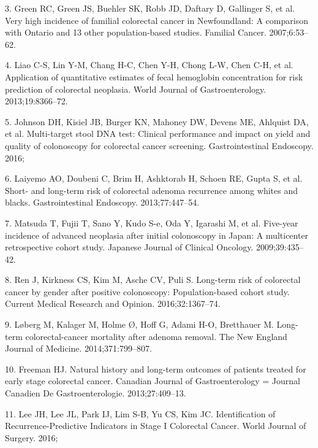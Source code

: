 \documentclass[12pt,]{article}
\begin{document}
\hypertarget{ref-green_very_2007}{}
3. Green RC, Green JS, Buehler SK, Robb JD, Daftary D, Gallinger S, et
al. Very high incidence of familial colorectal cancer in Newfoundland: A
comparison with Ontario and 13 other population-based studies. Familial
Cancer. 2007;6:53--62.

\hypertarget{ref-liao_application_2013}{}
4. Liao C-S, Lin Y-M, Chang H-C, Chen Y-H, Chong L-W, Chen C-H, et al.
Application of quantitative estimates of fecal hemoglobin concentration
for risk prediction of colorectal neoplasia. World Journal of
Gastroenterology. 2013;19:8366--72.

\hypertarget{ref-johnson_multi-target_2016}{}
5. Johnson DH, Kisiel JB, Burger KN, Mahoney DW, Devens ME, Ahlquist DA,
et al. Multi-target stool DNA test: Clinical performance and impact on
yield and quality of colonoscopy for colorectal cancer screening.
Gastrointestinal Endoscopy. 2016;

\hypertarget{ref-laiyemo_short-_2013}{}
6. Laiyemo AO, Doubeni C, Brim H, Ashktorab H, Schoen RE, Gupta S, et
al. Short- and long-term risk of colorectal adenoma recurrence among
whites and blacks. Gastrointestinal Endoscopy. 2013;77:447--54.

\hypertarget{ref-matsuda_five-year_2009}{}
7. Matsuda T, Fujii T, Sano Y, Kudo S-e, Oda Y, Igarashi M, et al.
Five-year incidence of advanced neoplasia after initial colonoscopy in
Japan: A multicenter retrospective cohort study. Japanese Journal of
Clinical Oncology. 2009;39:435--42.

\hypertarget{ref-ren_long-term_2016}{}
8. Ren J, Kirkness CS, Kim M, Asche CV, Puli S. Long-term risk of
colorectal cancer by gender after positive colonoscopy: Population-based
cohort study. Current Medical Research and Opinion. 2016;32:1367--74.

\hypertarget{ref-loberg_long-term_2014}{}
9. Løberg M, Kalager M, Holme Ø, Hoff G, Adami H-O, Bretthauer M.
Long-term colorectal-cancer mortality after adenoma removal. The New
England Journal of Medicine. 2014;371:799--807.

\hypertarget{ref-freeman_natural_2013}{}
10. Freeman HJ. Natural history and long-term outcomes of patients
treated for early stage colorectal cancer. Canadian Journal of
Gastroenterology = Journal Canadien De Gastroenterologie.
2013;27:409--13.

\hypertarget{ref-lee_identification_2016}{}
11. Lee JH, Lee JL, Park IJ, Lim S-B, Yu CS, Kim JC. Identification of
Recurrence-Predictive Indicators in Stage I Colorectal Cancer. World
Journal of Surgery. 2016;
\end{document}
